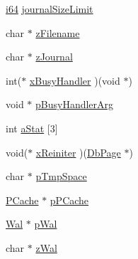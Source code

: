 \begin{DoxyCompactItemize}
\item 
\hyperlink{sqlite3_8c_a2a0f0f4ae7001eb54351f77ea1cdbcfd}{i64} \hyperlink{struct_pager_ae381db4e0b49f92596b0cdeb279e6bc6}{journal\-Size\-Limit}
\item 
char $\ast$ \hyperlink{struct_pager_a2a55a044468f8658b7993e57087a5561}{z\-Filename}
\item 
char $\ast$ \hyperlink{struct_pager_ab36ce1f606c407ad3fc56a3651f5a319}{z\-Journal}
\item 
int($\ast$ \hyperlink{struct_pager_ac8477f7cc39fefd81b4089994e13d215}{x\-Busy\-Handler} )(void $\ast$)
\item 
void $\ast$ \hyperlink{struct_pager_a7a685e7a8dcbcd725c5a982fd8deb91b}{p\-Busy\-Handler\-Arg}
\item 
int \hyperlink{struct_pager_a0b3bb8afc7c4c82e0e99f3ad99dd0986}{a\-Stat} \mbox{[}3\mbox{]}
\item 
void($\ast$ \hyperlink{struct_pager_a632d3c81743a7f9104337ae3d45af04c}{x\-Reiniter} )(\hyperlink{sqlite3_8c_aa41da1cdeedecb95acdb716e16bd9266}{Db\-Page} $\ast$)
\item 
char $\ast$ \hyperlink{struct_pager_a64934188c72599e0be9ae54d3fc1cc92}{p\-Tmp\-Space}
\item 
\hyperlink{struct_p_cache}{P\-Cache} $\ast$ \hyperlink{struct_pager_ae2495e45e354e92a858144386f91cab3}{p\-P\-Cache}
\item 
\hyperlink{struct_wal}{Wal} $\ast$ \hyperlink{struct_pager_a2c759424108248d8b08e6f400fab14dd}{p\-Wal}
\item 
char $\ast$ \hyperlink{struct_pager_ac63ab281e48f9ac8521b85c1a90475b3}{z\-Wal}
\end{DoxyCompactItemize}


